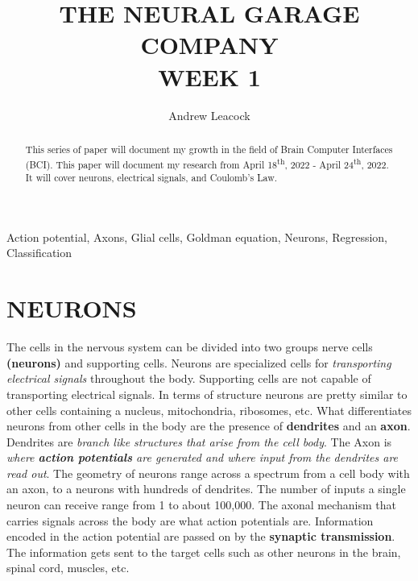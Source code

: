 \documentclass[english]{def}
\title{THE NEURAL GARAGE COMPANY\\\small{WEEK 1}}
\author{Andrew Leacock}
\begin{document}
\maketitle



\englishtitle

\begin{abstract}
	This series of paper will document my growth in the field of Brain Computer Interfaces (BCI). This paper will document my research from April 18\textsuperscript{th}, 2022 - April 24\textsuperscript{th}, 2022. It will cover neurons, electrical signals, and Coulomb’s Law.
\end{abstract}

\begin{keywords}
	Action potential, Axons, Glial cells, Goldman equation, Neurons, Regression, Classification
\end{keywords}

\let\thefootnote\relax\footnotetext{\hspace*{-5mm}}


\section{NEURONS}
The cells in the nervous system can be divided into two groups nerve cells \textbf{(neurons)} and supporting cells. Neurons are specialized cells for \emph{transporting electrical signals} throughout the body. Supporting cells are not capable of transporting electrical signals. In terms of structure neurons are pretty similar to other cells containing a nucleus, mitochondria, ribosomes, etc. What differentiates neurons from other cells in the body are the presence of \textbf{dendrites} and an \textbf{axon}. Dendrites are \emph{branch like structures that arise from the cell body}. The Axon is \emph{where \textbf{action potentials} are generated and where input from the dendrites are read out}. The geometry of neurons range across a spectrum from a cell body with an axon, to a neurons with hundreds of dendrites. The number of inputs a single neuron can receive range from 1 to about 100,000. The axonal mechanism that carries signals across the body are what action potentials are. Information encoded in the action potential are passed on by the \textbf{synaptic transmission}. The information gets sent to the target cells such as other neurons in the brain, spinal cord, muscles, etc. 
\end{document}
